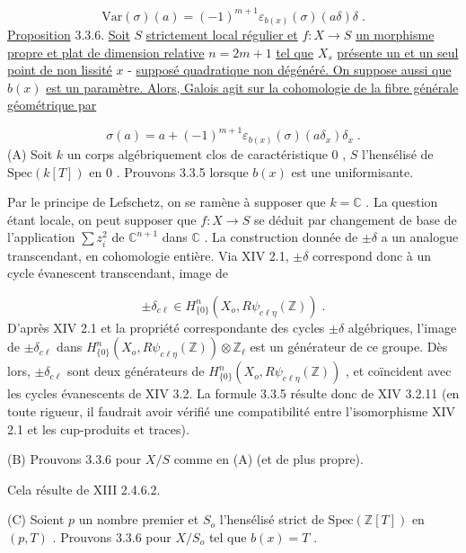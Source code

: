 \begin{equation*}
\mathrm{Var}(\sigma)(a) = (-1)^{m+1} \varepsilon_{b(x)}(\sigma)(a\delta)\delta \;.
\end{equation*}
\underline{Proposition} 3.3.6. \underline{Soit} $S$ \underline{strictement local régulier et} $f : X \to S$ \underline{un morphisme propre et plat de dimension relative} $n = 2m + 1$ \underline{tel que} $X_s$ \underline{présente un et un seul point de non lissité} $x$ - \underline{supposé quadratique non dégénéré. On suppose aussi que} $b(x)$ \underline{est un paramètre. Alors, Galois agit sur la cohomologie de la fibre générale géométrique par}

\begin{equation*}
\sigma(a) = a+(-1)^{m+1} \varepsilon_{b(x)}(\sigma)(a\delta_x)\delta_x \;.
\end{equation*}
(A) Soit $k$ un corps algébriquement clos de caractéristique $0$ , $S$ l'hensélisé
de $\mathrm{Spec}(k[T])$ en $0$ . Prouvons 3.3.5 lorsque $b(x)$ est une uniformisante.

Par le principe de Lefschetz, on se ramène à supposer que $k = \mathbb{C}$ . La question étant locale, on peut supposer que $f : X \to S$ se déduit par changement de base de l'application $\sum z_i^2$ de $\mathbb{C}^{n+1}$ dans $\mathbb{C}$ . La construction donnée de $\pm \delta$ a un analogue transcendant, en cohomologie entière. Via XIV 2.1, $\pm \delta$ correspond donc à un cycle évanescent transcendant, image de

\begin{equation*}
\pm \delta_{c\ell} \in H^{n}_{\{0\}}(X_o,R\psi_{c\ell\eta}(\mathbb{Z})) \;.
\end{equation*}
D'après XIV 2.1 et la propriété correspondante des cycles $\pm \delta$ algébriques, l'image de $\pm \delta_{c\ell}$ dans $H^n_{\{0\}}(X_o,R\psi_{c\ell\eta}(\mathbb{Z})) \otimes \mathbb{Z}_\ell$ est un générateur de ce groupe. Dès lors, $\pm \delta_{c\ell}$ sont deux générateurs de $H^n_{\{0\}}(X_o,R\psi_{c\ell\eta}(\mathbb{Z}))$ , et coïncident avec les cycles évanescents de XIV 3.2. La formule 3.3.5 résulte donc de XIV 3.2.11 (en toute rigueur, il faudrait avoir vérifié une compatibilité entre l'isomorphisme XIV 2.1 et les cup-produits et traces).

(B) Prouvons 3.3.6 pour $X/S$ comme en (A) (et de plus propre).

Cela résulte de XIII 2.4.6.2.

(C) Soient $p$ un nombre premier et $S_o$ l'hensélisé strict de $\mathrm{Spec}(\mathbb{Z}[T])$ en $(p,T)$ . Prouvons 3.3.6 pour $X/S_o$ tel que $b(x) = T$ .

